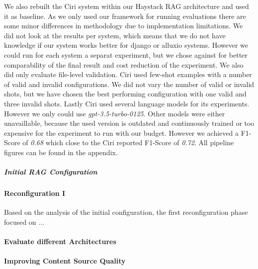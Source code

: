 We also rebuilt the Ciri system within our Haystack RAG architecture and used it as baseline. As we only used our framework for running evaluations there are some minor differences in methodology due to implementation limitations. We did not look at the results per system, which means that we do not have knowledge if our system works better for django or alluxio systems. However we could run for each system a separat experiment, but we chose against for better comparability of the final result and cost reduction of the experiment. We also did only evaluate file-level validation. Ciri used few-shot examples with a number of valid and invalid configurations. We did not vary the number of valid or invalid shots, but we have chosen the best performing configuration with one valid and three invalid shots. Lastly Ciri used several language models for its experiments. However we only could use \textit{gpt-3.5-turbo-0125}\cite{OpenAI_2022}. Other models were either unavaillable, because the used version is outdated and continuously trained or too expensive for the experiment to run with our budget. However we achieved a F1-Score of \textit{0.68} which close to the Ciri reported F1-Score of \textit{0.72}. All pipeline figures can be found in the appendix.

\subparagraph{Initial RAG Configuration} 


\paragraph{Reconfiguration I} \label{sec:exp_reconfig_1}
Based on the analysis of the initial configuration, the first reconfiguration phase focused on ...


\paragraph{Evaluate different Architectures}

\paragraph{Improving Content Source Quality}

